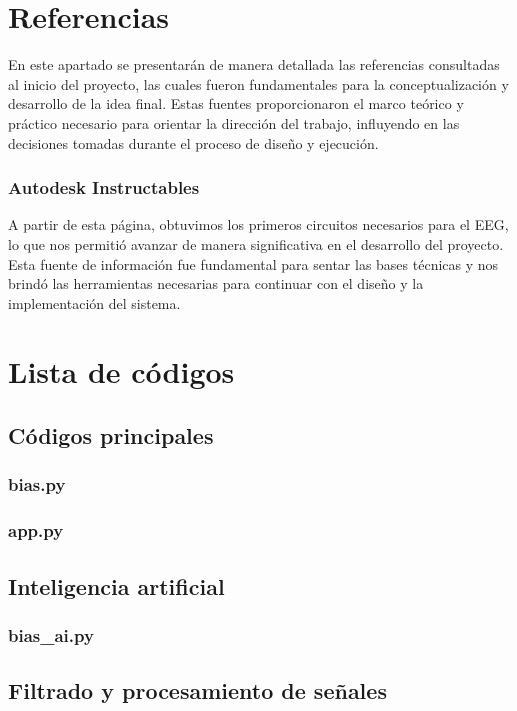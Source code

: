 \documentclass{article}
\begin{document}
\section{Referencias}
En este apartado se presentarán de manera detallada las referencias consultadas al inicio del proyecto, las cuales fueron fundamentales para la conceptualización y desarrollo de la idea final. Estas fuentes proporcionaron el marco teórico y práctico necesario para orientar la dirección del trabajo, influyendo en las decisiones tomadas durante el proceso de diseño y ejecución.
\subsubsection{Autodesk Instructables}
A partir de esta página, obtuvimos los primeros circuitos necesarios para el EEG, lo que nos permitió avanzar de manera significativa en el desarrollo del proyecto. Esta fuente de información fue fundamental para sentar las bases técnicas y nos brindó las herramientas necesarias para continuar con el diseño y la implementación del sistema.


\section{Lista de códigos}

\subsection{Códigos principales}

\subsubsection{bias.py}


\subsubsection{app.py}

\subsection{Inteligencia artificial}

\subsubsection{bias\_ai.py}

\subsection{Filtrado y procesamiento de señales}
\end{document}

